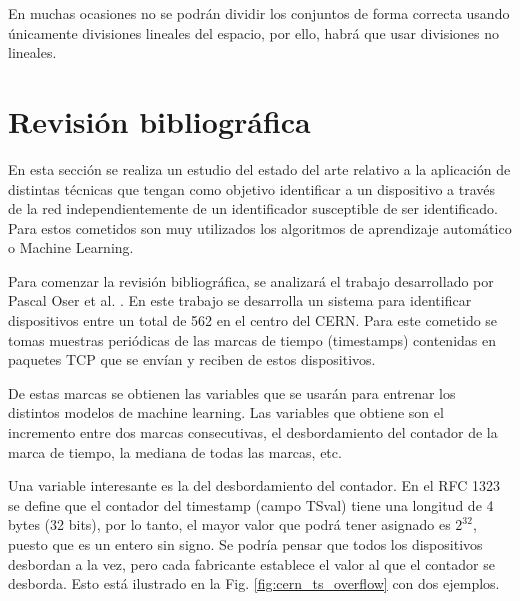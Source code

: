 En muchas ocasiones no se podrán dividir los conjuntos de forma correcta usando únicamente divisiones lineales del espacio, por ello, habrá que usar divisiones no lineales.

\section{Revisión bibliográfica}

En esta sección se realiza un estudio del estado del arte relativo a la aplicación de distintas técnicas que tengan como objetivo identificar a un dispositivo a través de la red independientemente de un identificador susceptible de ser identificado. Para estos cometidos son muy utilizados los algoritmos de aprendizaje automático o Machine Learning. 

Para comenzar la revisión bibliográfica, se analizará el trabajo desarrollado por Pascal Oser et al. \cite{oser2018identifying}. En este trabajo se desarrolla un sistema para identificar dispositivos entre un total de 562 en el centro del CERN. Para este cometido se tomas muestras periódicas de las marcas de tiempo (timestamps) contenidas en paquetes TCP que se envían y reciben de estos dispositivos.

De estas marcas se obtienen las variables que se usarán para entrenar los distintos modelos de machine learning. Las variables que obtiene son el incremento entre dos marcas consecutivas, el desbordamiento del contador de la marca de tiempo, la mediana de todas las marcas, etc.

Una variable interesante es la del desbordamiento del contador. En el RFC 1323 \cite{RFC1323} se define que el contador del timestamp (campo TSval) tiene una longitud de 4 bytes (32 bits), por lo tanto, el mayor valor que podrá tener asignado es $2^{32}$, puesto que es un entero sin signo. Se podría pensar que todos los dispositivos desbordan a la vez, pero cada fabricante establece el valor al que el contador se desborda. Esto está ilustrado en la Fig. \ref{fig:cern_ts_overflow} con dos ejemplos.

